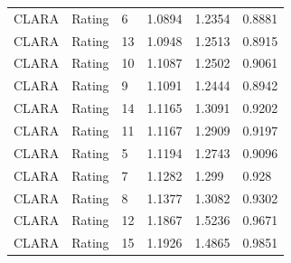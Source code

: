 \documentclass[12pt,a4paper,header]{abnt}
\begin{document}
\begin{longtable}{l|l|l|l|l|l}
CLARA    & Rating         & 6         & 1.0894 & 1.2354 & 0.8881 \\
CLARA    & Rating         & 13        & 1.0948 & 1.2513 & 0.8915 \\
CLARA    & Rating         & 10        & 1.1087 & 1.2502 & 0.9061 \\
CLARA    & Rating         & 9         & 1.1091 & 1.2444 & 0.8942 \\
CLARA    & Rating         & 14        & 1.1165 & 1.3091 & 0.9202 \\
CLARA    & Rating         & 11        & 1.1167 & 1.2909 & 0.9197 \\
CLARA    & Rating         & 5         & 1.1194 & 1.2743 & 0.9096 \\
CLARA    & Rating         & 7         & 1.1282 & 1.299  & 0.928  \\
CLARA    & Rating         & 8         & 1.1377 & 1.3082 & 0.9302 \\
CLARA    & Rating         & 12        & 1.1867 & 1.5236 & 0.9671 \\
CLARA    & Rating         & 15        & 1.1926 & 1.4865 & 0.9851 \\
\hline
\end{longtable}
% 
% 
% 
% 
% 
\end{document}
